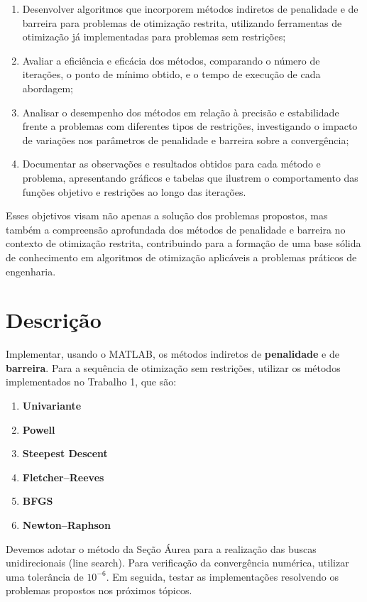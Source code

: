 \documentclass[a4paper, 12pt]{article}
\begin{document}
\begin{enumerate}
    \item Desenvolver algoritmos que incorporem métodos indiretos de penalidade e de barreira para problemas de otimização restrita, utilizando ferramentas de otimização já implementadas para problemas sem restrições;
    \item Avaliar a eficiência e eficácia dos métodos, comparando o número de iterações, o ponto de mínimo obtido, e o tempo de execução de cada abordagem;
    \item Analisar o desempenho dos métodos em relação à precisão e estabilidade frente a problemas com diferentes tipos de restrições, investigando o impacto de variações nos parâmetros de penalidade e barreira sobre a convergência;
    \item Documentar as observações e resultados obtidos para cada método e problema, apresentando gráficos e tabelas que ilustrem o comportamento das funções objetivo e restrições ao longo das iterações.
\end{enumerate}

Esses objetivos visam não apenas a solução dos problemas propostos, mas também a compreensão aprofundada dos métodos de penalidade e barreira no contexto de otimização restrita, contribuindo para a formação de uma base sólida de conhecimento em algoritmos de otimização aplicáveis a problemas práticos de engenharia.


\section{Descrição}

Implementar, usando o MATLAB, os métodos indiretos de \textbf{penalidade} e de \textbf{barreira}. Para a sequência de otimização sem restrições, utilizar os métodos implementados no Trabalho 1, que são:

\begin{enumerate}
\item \textbf{Univariante}
\item \textbf{Powell}
\item \textbf{Steepest Descent}
\item \textbf{Fletcher–Reeves}
\item \textbf{BFGS}
\item \textbf{Newton–Raphson}
\end{enumerate}

Devemos adotar o método da Seção Áurea para a realização das buscas unidirecionais (line search). Para verificação da convergência numérica, utilizar uma tolerância de $10^{-6}$. Em seguida, testar as implementações resolvendo os problemas propostos nos próximos tópicos.
\end{document}
